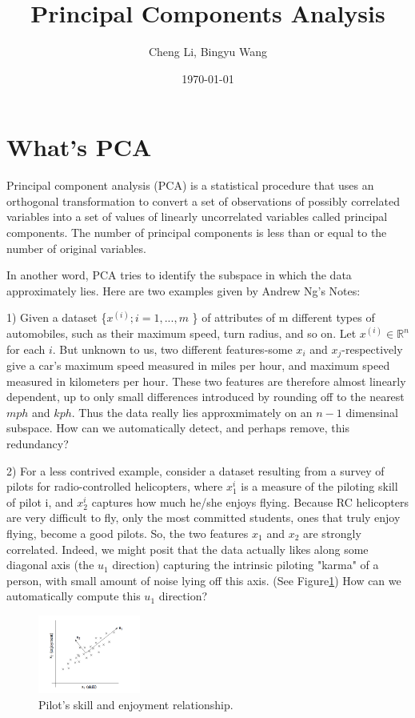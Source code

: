 \documentclass[a4paper]{article}
\title{Principal Components Analysis}
\author{Cheng Li, Bingyu Wang}
\date{\today}
\begin{document}
\maketitle
\section{What's PCA}

Principal component analysis (PCA) is a statistical procedure that uses an orthogonal transformation to convert a set of observations of possibly correlated variables into a set of values of linearly uncorrelated variables called principal components. The number of principal components is less than or equal to the number of original variables. 

In another word, PCA tries to identify the subspace in which the data approximately lies. Here are two examples given by Andrew Ng's Notes:

	1) Given a dataset \{$x^{(i)}; i = 1, ..., m$ \} of attributes of m different types of automobiles, such as their maximum speed, turn radius, and so on. Let $x^{(i)} \in \mathbb{R}^{n}$ for each $i$. But unknown to us, two different features-some $x_i$ and $x_j$-respectively give a car's maximum speed measured in miles per hour, and maximum speed measured in kilometers per hour. These two features are therefore almost linearly dependent, up to only small differences introduced by rounding off to the nearest $mph$ and $kph$. Thus the data really lies approxmimately on an $n-1$ dimensinal subspace. How can we automatically detect, and perhaps remove, this redundancy?
    
    2) For a less contrived example, consider a dataset resulting from a survey of pilots for radio-controlled helicopters, where $x_1^{i}$ is a measure of the piloting skill of pilot i, and $x_2^{i}$ captures how much he/she enjoys flying. Because RC helicopters are very difficult to fly, only the most committed students, ones that truly enjoy flying, become a good pilots. So, the two features $x_1$ and $x_2$ are strongly correlated. Indeed, we might posit that the data actually likes along some diagonal axis (the $u_1$ direction) capturing the intrinsic piloting "karma" of a person, with small amount of noise lying off this axis. (See Figure\ref{fig:pilot}) How can we automatically compute this $u_1$ direction?
    
\begin{figure}
\centering
\includegraphics[width=0.3\textwidth]{./images/pilot_example.png}
\caption{\label{fig:pilot} Pilot's skill and enjoyment relationship.}
\end{figure}
\end{document}
